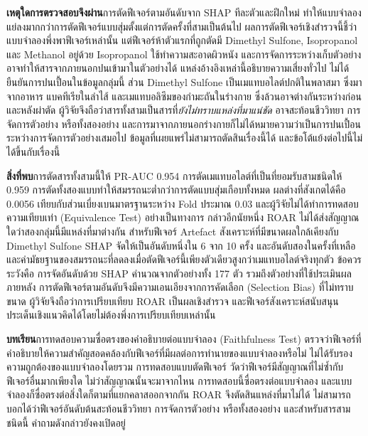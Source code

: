 \documentclass[11pt,a4paper]{article}
\newcommand{\storylabel}[1]{\textbf{#1}\quad}
\begin{document}
\storylabel{เหตุใดการตรวจสอบจึงผ่าน}การตัดฟีเจอร์ตามอันดับจาก SHAP ทีละตัวและฝึกใหม่
ทำให้แบบจำลองแย่ลงมากกว่าการตัดฟีเจอร์แบบสุ่มตั้งแต่การตัดครั้งที่สามเป็นต้นไป
ผลการตัดฟีเจอร์เชิงสำรวจนี้ชี้ว่าแบบจำลองพึ่งพาฟีเจอร์เหล่านั้น
แต่ฟีเจอร์ห้าตัวแรกที่ถูกตัดมี Dimethyl Sulfone, Isopropanol และ Methanol อยู่ด้วย
Isopropanol ใช้ทำความสะอาดผิวหนัง
และการจัดการระหว่างเก็บตัวอย่างอาจทำให้สารจากภายนอกปนเข้ามาในตัวอย่างได้
\cite{bernini2011, vandersar2015} แหล่งอ้างอิงเหล่านี้อธิบายความเสี่ยงทั่วไป
ไม่ได้ยืนยันการปนเปื้อนในข้อมูลกลุ่มนี้ ส่วน Dimethyl Sulfone เป็นเมแทบอไลต์ปกติในพลาสมา
ซึ่งมาจากอาหาร แบคทีเรียในลำไส้ และเมแทบอลิซึมของกำมะถันในร่างกาย \cite{engelke2005}
ซึ่งล้วนอาจต่างกันระหว่างก่อนและหลังผ่าตัด
ผู้วิจัยจึงถือว่าสารทั้งสามเป็นสารที่\textit{ยังไม่ทราบแหล่งที่มาแน่ชัด}
อาจสะท้อนชีววิทยา การจัดการตัวอย่าง หรือทั้งสองอย่าง
และการมาจากภายนอกร่างกายก็ไม่ได้หมายความว่าเป็นการปนเปื้อนระหว่างการจัดการตัวอย่างเสมอไป
ข้อมูลที่เผยแพร่ไม่สามารถตัดสินเรื่องนี้ได้ และข้อโต้แย้งต่อไปนี้ไม่ได้ขึ้นกับเรื่องนี้

\storylabel{สิ่งที่พบ}การตัดสารทั้งสามนี้ให้ PR-AUC 0.954
การตัดเมแทบอไลต์ที่เป็นที่ยอมรับสามชนิดให้ 0.959
การตัดทั้งสองแบบทำให้สมรรถนะต่ำกว่าการตัดแบบสุ่มเกือบทั้งหมด
ผลต่างที่สังเกตได้คือ 0.0056 เทียบกับส่วนเบี่ยงเบนมาตรฐานระหว่าง Fold ประมาณ 0.03
และผู้วิจัยไม่ได้ทำการทดสอบความเทียบเท่า (Equivalence Test) อย่างเป็นทางการ
กล่าวอีกนัยหนึ่ง ROAR ไม่ได้ส่งสัญญาณใดว่าสองกลุ่มนี้มีแหล่งที่มาต่างกัน
สำหรับฟีเจอร์ Artefact สังเคราะห์ที่มีขนาดผลใกล้เคียงกับ Dimethyl Sulfone
SHAP จัดให้เป็นอันดับหนึ่งใน 6 จาก 10 ครั้ง และอันดับสองในครั้งที่เหลือ
และค่ามัธยฐานของสมรรถนะที่ลดลงเมื่อตัดฟีเจอร์นี้เพียงตัวเดียวสูงกว่าเมแทบอไลต์จริงทุกตัว
ข้อควรระวังคือ การจัดอันดับด้วย SHAP คำนวณจากตัวอย่างทั้ง 177 ตัว
รวมถึงตัวอย่างที่ใช้ประเมินผลภายหลัง
การตัดฟีเจอร์ตามอันดับจึงมีความเอนเอียงจากการคัดเลือก (Selection Bias) ที่ไม่ทราบขนาด
\cite{varma2006} ผู้วิจัยจึงถือว่าการเปรียบเทียบ ROAR เป็นผลเชิงสำรวจ
และฟีเจอร์สังเคราะห์สนับสนุนประเด็นเชิงแนวคิดได้โดยไม่ต้องพึ่งการเปรียบเทียบเหล่านั้น

\storylabel{บทเรียน}การทดสอบความซื่อตรงของคำอธิบายต่อแบบจำลอง (Faithfulness Test)
ตรวจว่าฟีเจอร์ที่คำอธิบายให้ความสำคัญสอดคล้องกับฟีเจอร์ที่มีผลต่อการทำนายของแบบจำลองหรือไม่
ไม่ได้รับรองความถูกต้องของแบบจำลองโดยรวม การทดสอบแบบตัดฟีเจอร์
วัดว่าฟีเจอร์มีสัญญาณที่ไม่ซ้ำกับฟีเจอร์อื่นมากเพียงใด ไม่ว่าสัญญาณนั้นจะมาจากไหน
การทดสอบนี้ซื่อตรงต่อแบบจำลอง และแบบจำลองก็ซื่อตรงต่อสิ่งใดก็ตามที่แยกคลาสออกจากกัน
\cite{adebayo2018, kumar2020} ROAR จึงตัดสินแหล่งที่มาไม่ได้
ไม่สามารถบอกได้ว่าฟีเจอร์อันดับต้นสะท้อนชีววิทยา การจัดการตัวอย่าง หรือทั้งสองอย่าง
และสำหรับสารสามชนิดนี้ คำถามดังกล่าวยังคงเปิดอยู่
\end{document}
